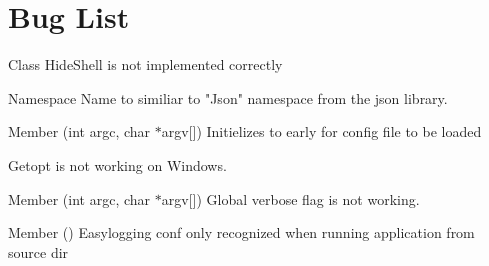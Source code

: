 \chapter{Bug List}
\hypertarget{bug}{}\label{bug}

\begin{DoxyRefList}
\item[Class \doxylink{classbatch_1_1BatchCreator}{batch\+::Batch\+Creator} ]\label{bug__bug000001}%
%
Hide\+Shell is not implemented correctly  
\item[Namespace \doxylink{namespacejson}{json} ]\label{bug__bug000002}%
%
 Name to similiar to "{}\+Json"{} namespace from the json library.  
\item[Member \doxylink{main_8cpp_a2b2d4ce8b34d14b9e775eaf6214b00e1}{main} (int argc, char \texorpdfstring{$\ast$}{*}argv\mbox{[}\mbox{]})]\label{bug__bug000005}%
%
Initielizes to early for config file to be loaded 

\label{bug__bug000006}%
%
Getopt is not working on Windows.  
\item[Member \doxylink{classutils_1_1StartupHandler_a9cdd57841cee245c1a1c94b0efe6549c}{utils\+::Startup\+Handler\+::get\+Options} (int argc, char \texorpdfstring{$\ast$}{*}argv\mbox{[}\mbox{]})]\label{bug__bug000004}%
%
 Global verbose flag is not working. 
\item[Member \doxylink{classutils_1_1StartupHandler_ade70b280d4385f270829b177da44b169}{utils\+::Startup\+Handler\+::init\+Easy\+Logging} ()]\label{bug__bug000003}%
%
 Easylogging conf only recognized when running application from source dir 
\end{DoxyRefList}